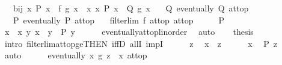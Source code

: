 \begin{isabellebody}
\ \ \ bij{\isacharcolon}{\kern0pt}\ {\isachardoublequoteopen}{\isasymAnd}x{\isachardot}{\kern0pt}\ P\ x\ {\isasymLongrightarrow}\ f\ {\isacharparenleft}{\kern0pt}g\ x{\isacharparenright}{\kern0pt}\ {\isacharequal}{\kern0pt}\ x{\isachardoublequoteclose}\ {\isachardoublequoteopen}{\isasymAnd}x{\isachardot}{\kern0pt}\ P\ x\ {\isasymLongrightarrow}\ Q\ {\isacharparenleft}{\kern0pt}g\ x{\isacharparenright}{\kern0pt}{\isachardoublequoteclose}\isanewline
\ \ \ Q{\isacharcolon}{\kern0pt}\ {\isachardoublequoteopen}eventually\ Q\ at{\isacharunderscore}{\kern0pt}top{\isachardoublequoteclose}\isanewline
\ \ \ P{\isacharcolon}{\kern0pt}\ {\isachardoublequoteopen}eventually\ P\ at{\isacharunderscore}{\kern0pt}top{\isachardoublequoteclose}\isanewline
\ \ \ {\isachardoublequoteopen}filterlim\ f\ at{\isacharunderscore}{\kern0pt}top\ at{\isacharunderscore}{\kern0pt}top{\isachardoublequoteclose}\isanewline
%
\isadelimproof
%
\endisadelimproof
%
\isatagproof
{}\isamarkupfalse%
\ {\isacharminus}{\kern0pt}\isanewline
\ \ \isamarkupfalse%
\ P\ \isamarkupfalse%
\ x\ \ x{\isacharcolon}{\kern0pt}\ {\isachardoublequoteopen}{\isasymAnd}y{\isachardot}{\kern0pt}\ x\ {\isasymle}\ y\ {\isasymLongrightarrow}\ P\ y{\isachardoublequoteclose}\isanewline
\ \ \ \ \isamarkupfalse%
\ eventually{\isacharunderscore}{\kern0pt}at{\isacharunderscore}{\kern0pt}top{\isacharunderscore}{\kern0pt}linorder\ \isamarkupfalse%
\ auto\isanewline
\ \ \isamarkupfalse%
\ {\isacharquery}{\kern0pt}thesis\isanewline
\ \ \isamarkupfalse%
\ {\isacharparenleft}{\kern0pt}intro\ filterlim{\isacharunderscore}{\kern0pt}at{\isacharunderscore}{\kern0pt}top{\isacharunderscore}{\kern0pt}ge{\isacharbrackleft}{\kern0pt}THEN\ iffD{}{\isacharbrackright}{\kern0pt}\ allI\ impI{\isacharparenright}{\kern0pt}\isanewline
\ \ \ \ \isamarkupfalse%
\ z\ \isamarkupfalse%
\ {\isachardoublequoteopen}x\ {\isasymle}\ z{\isachardoublequoteclose}\isanewline
\ \ \ \ \isamarkupfalse%
\ x\ \isamarkupfalse%
\ {\isachardoublequoteopen}P\ z{\isachardoublequoteclose}\ \isamarkupfalse%
\ auto\isanewline
\ \ \ \ \isamarkupfalse%
\ {\isachardoublequoteopen}eventually\ {\isacharparenleft}{\kern0pt}{\isasymlambda}x{\isachardot}{\kern0pt}\ g\ z\ {\isasymle}\ x{\isacharparenright}{\kern0pt}\ at{\isacharunderscore}{\kern0pt}top{\isachardoublequoteclose}\isanewline

\end{isabellebody}
